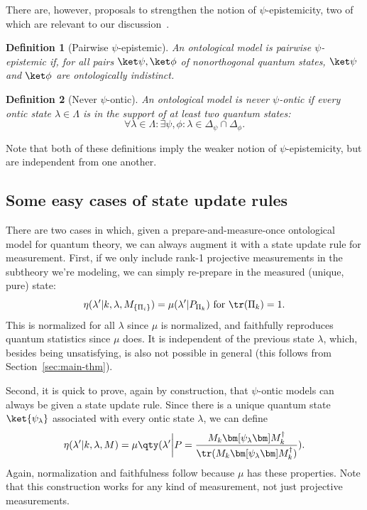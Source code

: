 \documentclass[%
 reprint,
superscriptaddress,
nofootinbib,
 amsmath,amssymb,
 prx, 
 accepted=2019-09-27,
]{quantumarticle}
\newtheorem{definition}{Definition}
\newcommand{\proj}[1]{{\bm[}#1{\bm]}}
\begin{document}
There are, however, proposals to strengthen the notion of
$\psi$-epistemicity, two of which are relevant to our
discussion~\cite{Leiferquantumstatereal2014,MontinaCommentmathoverflow2012}.
\begin{definition}[Pairwise $\psi$-epistemic]
  \label{def:pairwise}
  An ontological model is \emph{pairwise $\psi$-epistemic} if, for all
  pairs $\ket\psi,\ket\phi$ of nonorthogonal quantum states,
  $\ket\psi$ and $\ket\phi$ are ontologically indistinct.
\end{definition}
\begin{definition}[Never $\psi$-ontic]
  \label{def:never-ontic}
  An ontological model is \emph{never $\psi$-ontic} if every ontic
  state $\lambda\in\Lambda$ is in the support of at least two quantum
  states:
  \begin{equation}
    \label{eq:11}
    \forall\lambda\in\Lambda: \exists\psi,\phi: \lambda\in\Delta_\psi\cap\Delta_\phi.
  \end{equation}
\end{definition}
Note that both of these definitions imply the weaker notion of
$\psi$-epistemicity, but are independent from one another.

\subsection{Some easy cases of state update rules}
\label{sec:some-easy-cases}
There are two cases in which, given a prepare-and-measure-once
ontological model for quantum theory, we can always augment it with a
state update rule for measurement. First, if we only include rank-1
projective measurements in the subtheory we're modeling, we can simply
re-prepare in the measured (unique, pure) state:
\begin{equation}
  \label{eq:19}
  \eta(\lambda'|k,\lambda,M_{\{\Pi_i\}}) = \mu(\lambda'|P_{\Pi_k}) \text{ for }\tr(\Pi_k)=1.
\end{equation}
This is normalized for all $\lambda$ since $\mu$ is normalized, and
faithfully reproduces quantum statistics since $\mu$ does. It is
independent of the previous state $\lambda$, which, besides being
unsatisfying, is also not possible in general (this follows from
Section~\ref{sec:main-thm}).

Second, it is quick to prove, again by construction, that $\psi$-ontic
models can always be given a state update rule. Since there is a
unique quantum state $\ket{\psi_\lambda}$ associated with every ontic
state $\lambda$, we can define
\begin{equation}
  \label{eq:20}
  \eta(\lambda'|k,\lambda,M) = \mu\qty(\lambda'\bigg|P=\frac{M_k\proj{\psi_\lambda}M_k^\dag}{\tr(M_k\proj{\psi_\lambda}M_k^\dag)}).
\end{equation}
Again, normalization and faithfulness follow because $\mu$ has these
properties. Note that this construction works for any kind of
measurement, not just projective measurements.
\end{document}
